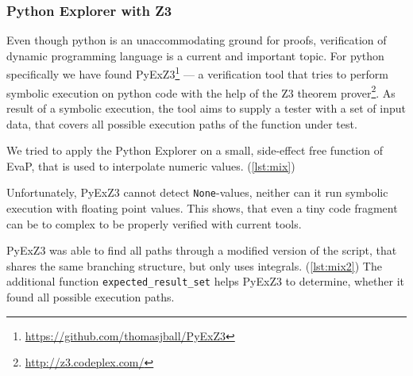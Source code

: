 \subsubsection{Python Explorer with Z3}

Even though python is an unaccommodating ground for proofs, verification of dynamic programming language is a current and important topic.
For python specifically we have found PyExZ3\footnote{\url{https://github.com/thomasjball/PyExZ3}} --- a verification tool that tries to perform symbolic execution on python code with the help of the Z3 theorem prover\footnote{\url{http://z3.codeplex.com/}}.
As result of a symbolic execution, the tool aims to supply a tester with a set of input data, that covers all possible execution paths of the function under test.

We tried to apply the Python Explorer on a small, side-effect free function of EvaP, that is used to interpolate numeric values. (\autoref{lst:mix})

Unfortunately, PyExZ3 cannot detect \texttt{None}-values, neither can it run symbolic execution with floating point values.
This shows, that even a tiny code fragment can be to complex to be properly verified with current tools.



PyExZ3 was able to find all paths through a modified version of the script, that shares the same branching structure, but only uses integrals. (\autoref{lst:mix2})
The additional function \texttt{expected\_result\_set} helps PyExZ3 to determine, whether it found all possible execution paths.


